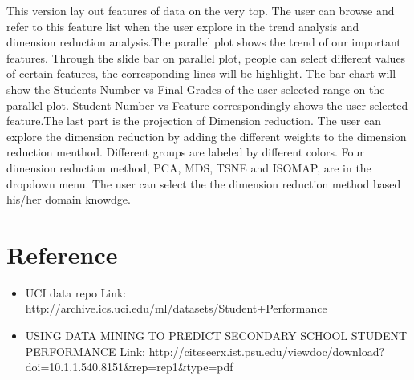 \documentclass{article}
\begin{document}
This version lay out features of data on the very top. The user can browse and refer to this feature list when the user explore in the trend analysis and dimension reduction analysis.The parallel plot shows the trend of our important features. Through the slide bar on parallel plot, people can select different values of certain features, the corresponding lines will be highlight. The bar chart will show the Students Number vs Final Grades of the user selected range on the parallel plot. Student Number vs Feature correspondingly shows the user selected feature.The last part is the projection of Dimension reduction. The user can explore the dimension reduction by adding the different weights to the dimension reduction menthod. Different groups are labeled by different colors. Four dimension reduction method, PCA, MDS, TSNE and  ISOMAP, are in the dropdown menu. The user can select the the dimension reduction method based his/her domain knowdge.


\section{Reference}
\begin{itemize}
\item UCI data repo Link: {http://archive.ics.uci.edu/ml/datasets/Student+Performance}
\item  USING DATA MINING TO PREDICT SECONDARY SCHOOL STUDENT PERFORMANCE Link: {http://citeseerx.ist.psu.edu/viewdoc/download?doi=10.1.1.540.8151\&rep=rep1\&type=pdf}
\end{itemize}
\end{document}
